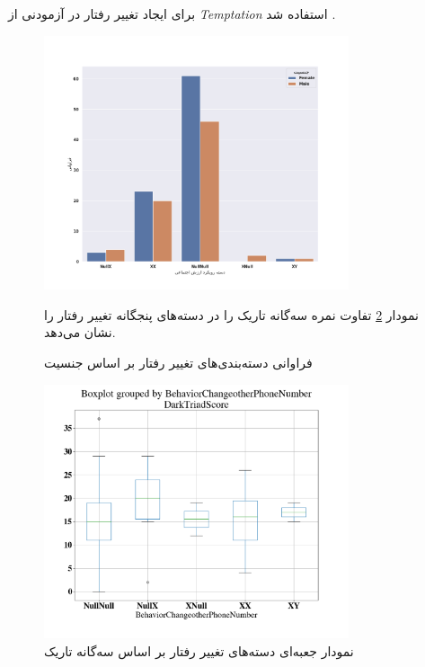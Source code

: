 برای ایجاد تغییر رفتار در آزمودنی از
\!\textit{
    \gls{Temptation}
}
استفاده شد
\citep{maihaniemiCompetitionLawBig2020}.
\begin{figure}[htpb]
    \centering
    \includegraphics[width=0.8\textwidth]{./img/FrequencyBehaviorPhoneNumber.png}
    \caption{فراوانی دسته‌بندی‌های تغییر رفتار بر اساس جنسیت}
    \label{fig:FrequencyBehaviorPhoneNumber}



    نمودار
    \ref{fig:BehavioralChange_DarkTriad_Boxplot}
    تفاوت نمره سه‌گانه تاریک را در دسته‌های پنجگانه تغییر رفتار  را نشان می‌دهد.

\end{figure}
\begin{figure}[htpb]
    \centering
    \includegraphics[width=0.8\textwidth]{./img/BehavioralChange_DarkTriad_Boxplot.png}
    \caption{نمودار جعبه‌ای دسته‌های تغییر رفتار بر اساس سه‌گانه تاریک}
    \label{fig:BehavioralChange_DarkTriad_Boxplot}
\end{figure}

